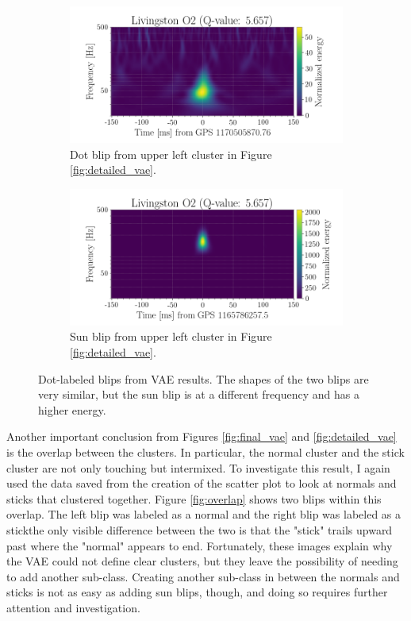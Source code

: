 \documentclass[a4paper]{article}
\begin{document}
\begin{figure}[h!]
	\centering
	\begin{subfigure}{.49\textwidth}
		\centering
		\includegraphics[width=1\linewidth]{dot_lowF}
		\caption{Dot blip from upper left cluster in Figure \ref{fig:detailed_vae}.}
		\label{fig:dot_lowf}
	\end{subfigure}
	\begin{subfigure}{.49\textwidth}
		\centering
		\includegraphics[width=1\linewidth]{dot_highF}
		\caption{Sun blip from upper left cluster in Figure \ref{fig:detailed_vae}.}
		\label{fig:dot_highf}
	\end{subfigure}
	\caption{Dot-labeled blips from VAE results. The shapes of the two blips are very similar, but the sun blip is at a different frequency and has a higher energy.}
	\label{fig:two_dots}
\end{figure}

Another important conclusion from Figures \ref{fig:final_vae} and \ref{fig:detailed_vae} is the overlap between the clusters. In particular, the normal cluster and the stick cluster are not only touching but intermixed. To investigate this result, I again used the data saved from the creation of the scatter plot to look at normals and sticks that clustered together. Figure \ref{fig:overlap} shows two blips within this overlap. The left blip was labeled as a normal and the right blip was labeled as a stick\textemdash the only visible difference between the two is that the "stick" trails upward past where the "normal" appears to end. Fortunately, these images explain why the VAE could not define clear clusters, but they leave the possibility of needing to add another sub-class. Creating another sub-class in between the normals and sticks is not as easy as adding sun blips, though, and doing so requires further attention and investigation.
\end{document}
